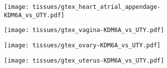 \documentclass{memoir}
\begin{document}
\begin{figure}
\begin{subfigure}[b]{0.3\textwidth}
         \centering
         \texttt{[image: tissues/gtex\_heart\_atrial\_appendage-KDM6A\_vs\_UTY.pdf]}
     \end{subfigure}
     \hfill
     \begin{subfigure}[b]{0.3\textwidth}
         \centering
         \texttt{[image: tissues/gtex\_vagina-KDM6A\_vs\_UTY.pdf]}
     \end{subfigure}
     \hfill
     \begin{subfigure}[b]{0.3\textwidth}
         \centering
         \texttt{[image: tissues/gtex\_ovary-KDM6A\_vs\_UTY.pdf]}
     \end{subfigure}
     \hfill
     \begin{subfigure}[b]{0.3\textwidth}
         \centering
         \texttt{[image: tissues/gtex\_uterus-KDM6A\_vs\_UTY.pdf]}
     \end{subfigure}
\end{figure}
\end{document}
